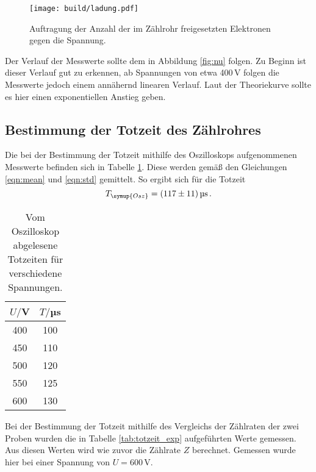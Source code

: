 \begin{figure}
  \centering
  \texttt{[image: build/ladung.pdf]}
  \caption{Auftragung der Anzahl der im Zählrohr freigesetzten Elektronen gegen die Spannung.}
  \label{fig:ladung}
\end{figure}

Der Verlauf der Messwerte sollte dem in Abbildung \ref{fig:nu} folgen. Zu Beginn ist
dieser Verlauf gut zu erkennen, ab Spannungen von etwa 400\,V folgen die Messwerte
jedoch einem annähernd linearen Verlauf. Laut der Theoriekurve sollte es hier
einen exponentiellen Anstieg geben.

\subsection{Bestimmung der Totzeit des Zählrohres}
\label{subsec:totzeit}
Die bei der Bestimmung der Totzeit mithilfe des Oszilloskops aufgenommenen Messwerte
befinden sich in Tabelle \ref{tab:totzeit_osz}. Diese werden gemäß den Gleichungen
\eqref{eqn:mean} und \eqref{eqn:std} gemittelt. So ergibt sich für die Totzeit
\begin{equation*}
  T_{\symup{Osz}}=(117\pm11)\,\text{µs}\,.
\end{equation*}

\begin{table}[htp]
	\begin{center}
    \caption{Vom Oszilloskop abgelesene Totzeiten für verschiedene Spannungen.}
    \label{tab:totzeit_osz}
		\begin{tabular}{cc}
		\toprule
			{$U/$V} & {$T/$µs} \\
			\midrule
      400 &  100    \\
      450 &  110    \\
      500 &  120    \\
      550 &  125    \\
      600 &  130    \\
		\bottomrule
		\end{tabular}
	\end{center}
\end{table}

Bei der Bestimmung der Totzeit mithilfe des Vergleichs der Zählraten der zwei
Proben wurden die in Tabelle \ref{tab:totzeit_exp} aufgeführten Werte gemessen.
Aus diesen Werten wird wie zuvor die Zählrate $Z$ berechnet. Gemessen wurde hier
bei einer Spannung von $U= 600\,$V.

